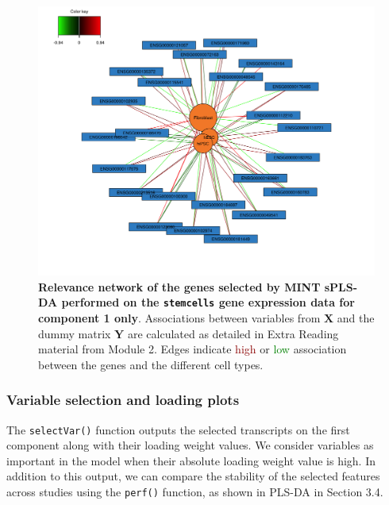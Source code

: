 \documentclass[]{book}
\newenvironment{Shaded}{\begin{snugshade}}{\end{snugshade}}
\newcommand{\KeywordTok}[1]{\textcolor[rgb]{0.13,0.29,0.53}{\textbf{#1}}}
\newcommand{\DataTypeTok}[1]{\textcolor[rgb]{0.13,0.29,0.53}{#1}}
\newcommand{\DecValTok}[1]{\textcolor[rgb]{0.00,0.00,0.81}{#1}}
\newcommand{\CommentTok}[1]{\textcolor[rgb]{0.56,0.35,0.01}{\textit{#1}}}
\newcommand{\OperatorTok}[1]{\textcolor[rgb]{0.81,0.36,0.00}{\textbf{#1}}}
\newcommand{\NormalTok}[1]{#1}
\begin{document}
\begin{figure}

{\centering \includegraphics[width=0.5\linewidth]{Figures/MINT/MINT-network-1} 

}

\caption{\textbf{Relevance network of the genes selected by
MINT sPLS-DA performed on the \texttt{stemcells} gene expression data
for component 1 only}. Associations between variables from
\(\boldsymbol X\) and the dummy matrix \(\boldsymbol Y\) are calculated
as detailed in Extra Reading material from Module 2. Edges indicate
\textcolor{darkred}{high} or \textcolor{green}{low} association between
the genes and the different cell types.}\label{fig:MINT-network}
\end{figure}









\subsubsection{Variable selection and loading
plots}\label{variable-selection-and-loading-plots}

The \texttt{selectVar()} function outputs the selected transcripts on
the first component along with their loading weight values. We consider
variables as important in the model when their absolute loading weight
value is high. In addition to this output, we can compare the stability
of the selected features across studies using the \texttt{perf()}
function, as shown in PLS-DA in Section 3.4.

\begin{Shaded}
\end{Shaded}
\end{document}
